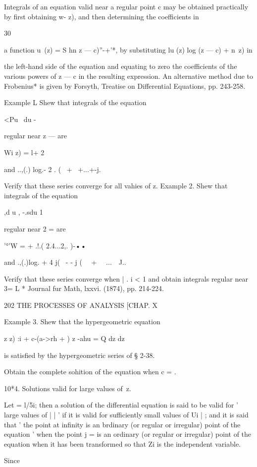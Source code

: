 Integrals of an equation valid near a regular point c may be obtained
practically by first obtaining w- z), and then determining the
coefficients in

30

a function u\ (z) = S hn z — c)''-+'*, by substituting lu (z) log (z —
c) + n\ z) in

the left-hand side of the equation and equating to zero the
coefficients of the various powers of z — c in the resulting
expression. An alternative method due to Frobenius* is given by
Forsyth, Treatise on Differential Equations, pp. 243-258.

Example L Shew that integrals of the equation

<Pu \ du -

regular near z — are

Wi z) = l+ 2

and ..,(.) log.- 2 . ( \ + \ +...+-j.

Verify that these series converge for all vahies of z. Example 2. Shew
that integrals of the equation

 ,d u , -.sdu 1

regular near 2 = are

'°'W = + .!.( 2.4...2,. )-••

and .,(.)log. + 4 j( \ - - j ( \ \ + \ \ ...\ \ J..

Verify that these series converge when | . i < 1 and obtain integrals
regular near 3= L * Journal fur Math, lxxvi. (1874), pp. 214-224.

202 THE PROCESSES OF ANALYSIS [CHAP. X

Example 3. Shew that the hypergeometric equation

z z) :i + c-(a->rh + ) z -ahu = Q dz dz

is satisfied by the hypergeometric series of § 2-38.

Obtain the complete sohition of the equation when c = .

10*4. Solutions valid for large values of\ z.

Let = l/5i; then a solution of the differential equation is said to be
valid for ' large values of | | ' if it is valid for sufficiently
small values of Ui | ; and it is said that ' the point at infinity is
an brdinary (or regular or irregular) point of the equation ' when the
point j = is an ordinary (or regular or irregular) point of the
equation when it has been transformed so that Zi is the independent
variable.

Since

